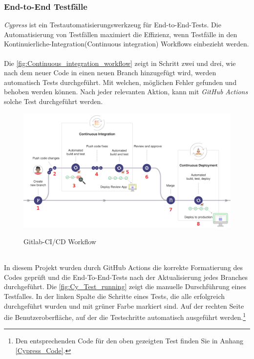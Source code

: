 \subsubsection*{End-to-End Testfälle}
\textit{Cypress} ist ein Testautomatisierungswerkzeug für End-to-End-Tests. 
Die Automatisierung von Testfällen maximiert die Effizienz, wenn Testfälle in den Kontinuierliche-Integration(Continuous integration) Workflows einbezieht werden. %
\\\\
Die \autoref{fig:Continuous_integration_workflow} zeigt in Schritt zwei und drei, wie nach dem neuer Code in einen neuen Branch hinzugefügt wird, werden automatisch Tests durchgeführt. Mit welchen, möglichen Fehler gefunden und behoben werden können. Nach jeder relevanten Aktion, kann mit \textit{GitHub Actions} solche Test durchgeführt werden.
\begin{figure}[h!]
	\centering
    \includegraphics[width=\textwidth]{sources/Gitlab-CI.png}
	\caption{Gitlab-CI/CD Workflow}
	\label{fig:Continuous_integration_workflow} {\cite{GLAB1}}
\end{figure}
\\
In diesem Projekt wurden durch GitHub Actions die korrekte Formatierung des Codes geprüft und die End-To-End-Tests nach der Aktualisierung jedes Branches durchgeführt.
\newpage
Die \autoref{fig:Cy_Test_running} zeigt die manuelle Durschführung eines Testfalles. In der linken Spalte die Schritte eines Tests, die alle erfolgreich durchgeführt wurden und mit grüner Farbe markiert sind. Auf der rechten Seite die Benutzeroberfläche, auf der die Testschritte automatisch ausgeführt werden.\footnote{Den entsprechenden Code für den oben gezeigten Test finden Sie in Anhang \ref{Cypress_Code}.
}
